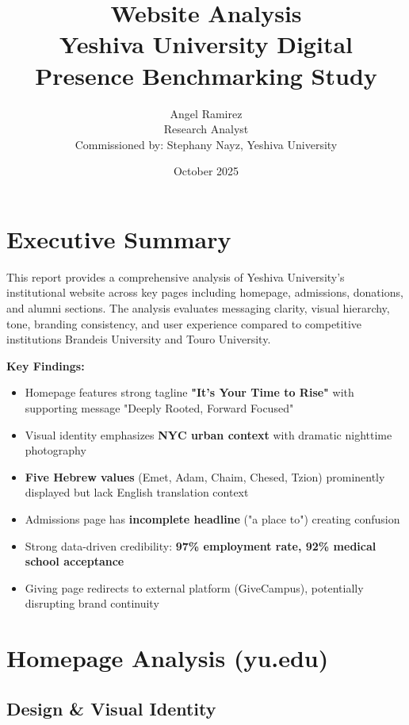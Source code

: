 \documentclass[12pt,letterpaper]{article}
\title{\textbf{Website Analysis}\\
\large Yeshiva University Digital Presence Benchmarking Study}
\author{Angel Ramirez\\
\small Research Analyst\\
\small Commissioned by: Stephany Nayz, Yeshiva University}
\date{October 2025}
\begin{document}
\maketitle

\section*{Executive Summary}

This report provides a comprehensive analysis of Yeshiva University's institutional website across key pages including homepage, admissions, donations, and alumni sections. The analysis evaluates messaging clarity, visual hierarchy, tone, branding consistency, and user experience compared to competitive institutions Brandeis University and Touro University.

\textbf{Key Findings:}
\begin{itemize}[leftmargin=*]
    \item Homepage features strong tagline \textbf{"It's Your Time to Rise"} with supporting message "Deeply Rooted, Forward Focused"
    \item Visual identity emphasizes \textbf{NYC urban context} with dramatic nighttime photography
    \item \textbf{Five Hebrew values} (Emet, Adam, Chaim, Chesed, Tzion) prominently displayed but lack English translation context
    \item Admissions page has \textbf{incomplete headline} ("a place to") creating confusion
    \item Strong data-driven credibility: \textbf{97\% employment rate, 92\% medical school acceptance}
    \item Giving page redirects to external platform (GiveCampus), potentially disrupting brand continuity
\end{itemize}

\section{Homepage Analysis (yu.edu)}

\subsection{Design \& Visual Identity}
\end{document}
